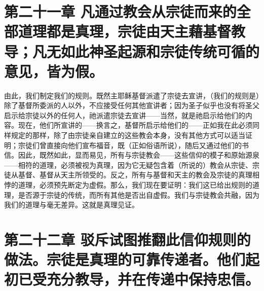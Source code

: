 
\section{第二十一章 凡通过教会从宗徒而来的全部道理都是真理，宗徒由天主藉基督教导；凡无如此神圣起源和宗徒传统可循的意见，皆为假。}

由此，我们制定我们的规则。既然主耶稣基督派遣了宗徒去宣讲，（我们的规则是）除了基督所委派的人以外，不应接受任何其他宣讲者；因为圣子似乎也没有将圣父启示给宗徒以外的任何人，祂派遣宗徒去宣讲——当然，就是祂启示给他们的内容。现在，他们所宣讲的——换言之，基督所启示给他们的——正如我在此必须同样规定的那样，除了由宗徒亲自建立的这些教会本身，没有其他方式可以适当证明；宗徒们曾直接向他们宣布福音，既（正如俗语所说），随后又通过他们的书信。因此，既然如此，显而易见，所有与宗徒教会——这些信仰的模子和原始源泉——相符的道理，必须被视为真理，因为它无疑包含着（所说的）教会从宗徒、宗徒从基督、基督从天主所领受的。反之，所有与基督和天主的教会及宗徒的真理相悖的道理，必须预先断定为虚假。那么，我们现在要证明：我们这已给出规则的道理，是否源于宗徒的传统，而所有其他是否出自虚假。我们与宗徒教会共融，因为我们的道理与毫无差异。这就是真理见证。\newline{}\par


\section{第二十二章 驳斥试图推翻此信仰规则的做法。宗徒是真理的可靠传递者。他们起初已受充分教导，并在传递中保持忠信。}

